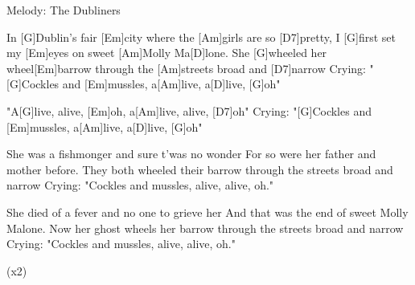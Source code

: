 Melody: The Dubliners


\begin{guitar}
	In [G]Dublin's fair [Em]city where the [Am]girls are so [D7]pretty,
	I [G]first set my [Em]eyes on sweet [Am]Molly Ma[D]lone.
	She [G]wheeled her wheel[Em]barrow through the [Am]streets broad and [D7]narrow
	Crying: "[G]Cockles and [Em]mussles, a[Am]live, a[D]live, [G]oh"
	
	"A[G]live, alive, [Em]oh, a[Am]live, alive, [D7]oh"
	Crying: "[G]Cockles and [Em]mussles, a[Am]live, a[D]live, [G]oh"
	
	She was a fishmonger and sure t'was no wonder
	For so were her father and mother before.
	They both wheeled their barrow through the streets broad and narrow
	Crying: "Cockles and mussles, alive, alive, oh."
	
	 
	
	She died of a fever and no one to grieve her
	And that was the end of sweet Molly Malone.
	Now her ghost wheels her barrow through the streets broad and narrow
	Crying: "Cockles and mussles, alive, alive, oh."
	
	  (x2)
\end{guitar}

\pagebreak



